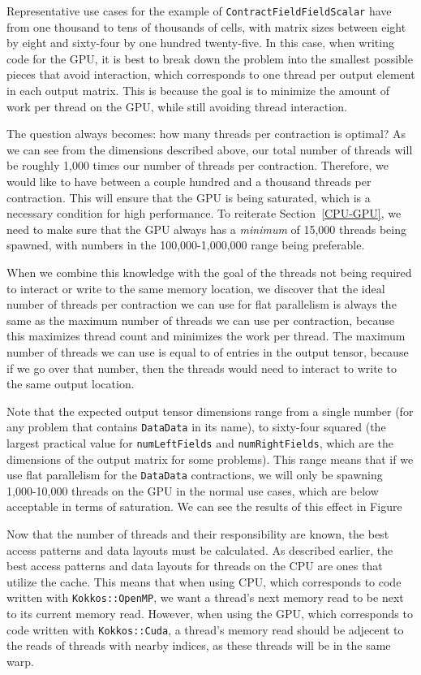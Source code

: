 Representative use cases for the example of
\texttt{ContractFieldFieldScalar} have from one thousand to tens of thousands of cells, with
matrix sizes between eight by eight and sixty-four by one hundred twenty-five. In this case, 
when writing code for the GPU, it
is best to break down the problem into the smallest possible pieces that avoid interaction, which corresponds
to one thread per output element in each output matrix. This is
because the goal is to minimize the amount of work per thread on the GPU, while still
avoiding thread interaction. 

The question always becomes: how many threads per contraction is optimal? 
As we can see from the dimensions described above, our total number of threads will 
be roughly 1,000 times our number of threads per contraction. Therefore, we would like
to have between a couple hundred and a thousand threads per contraction. 
This will ensure that the GPU is being saturated, which is a necessary condition for
high performance.
To reiterate Section~\ref{CPU-GPU}, we need to make sure that the GPU always has a 
\emph{minimum} of 15,000 threads being
spawned, with numbers in the 100,000-1,000,000 range being preferable.

When we combine this knowledge with the
goal of the threads not being required to interact or write to the same
memory location, we discover that the ideal number of threads per contraction we can use for flat parallelism
is always the same as the maximum number of threads we can use per contraction, because
this maximizes thread count and minimizes the work per thread. 
The maximum number of threads we can use is equal to of entries in the output tensor,
because if we go over that number, then the threads would need to interact to write
to the same output location.

Note that the
expected output tensor dimensions range from a single number (for any problem
that contains \texttt{DataData} in its name), to sixty-four squared (the largest practical value for
\texttt{numLeftFields} and \texttt{numRightFields}, which are the dimensions of the output matrix
for some problems). This range means that if we use flat parallelism for the \texttt{DataData} contractions,
we will only be spawning 1,000-10,000 threads on the GPU in the normal use cases,
which are below acceptable in terms of saturation. We can see the results of this effect in Figure~%

Now that the number of threads and their responsibility are known, the best
access patterns and data layouts must be calculated. As described earlier, the
best access patterns and data layouts for threads on the CPU are ones that
utilize the cache. This means that when using CPU, which corresponds to code written with \texttt{Kokkos::OpenMP},
we want a thread's next memory read to be next to its current memory read.
However, when using the GPU, which corresponds to code written with \texttt{Kokkos::Cuda}, a thread's memory read should
be adjecent to the reads of threads with nearby indices, as these threads will be in the same warp. 

